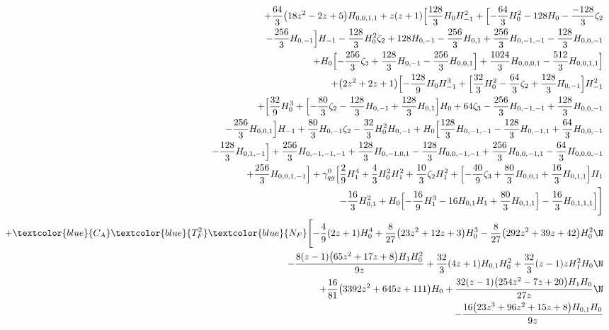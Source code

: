 \begin{eqnarray}
\nonumber \\ &&
+\frac{64}{3} \big(18 z^2-2 z+5\big) H_{0,0,1,1}+z (z+1)\Bigl[\frac{128}{3} H_0 H_{-1}^2+\Bigl[-\frac{64}{3} H_0^2-128 H_0-\frac{-128}{3} \zeta_2
\nonumber \\ &&
-\frac{256}{3} H_{0,-1}\Bigr] H_{-1}-\frac{128}{3}  H_0^2 \zeta_2+128 H_{0,-1}-\frac{256}{3}  H_{0,1}
+\frac{256}{3}H_{0,-1,-1}-\frac{128}{3}H_{0,0,-1}
\nonumber \\ &&
+H_0 \Bigl[-\frac{256}{3}  \zeta_3+\frac{128}{3}H_{0,-1}
-\frac{256}{3}  H_{0,0,1}\Bigr]+\frac{1024}{3}  H_{0,0,0,1}-\frac{512}{3} H_{0,0,1,1}\Bigr]
\nonumber \\ &&
+\big(2 z^2+2 z+1\big) \Bigl[-\frac{128}{9} H_0H_{-1}^3+\Bigl[\frac{32}{3} H_0^2-\frac{64}{3} \zeta_2+\frac{128}{3} H_{0,-1}
\Bigr]H_{-1}^2
\nonumber \\ &&
+\Bigl[\frac{32}{9} H_0^3+\Bigl[-\frac{80}{3}\zeta_2-\frac{128}{3} H_{0,-1}
+\frac{128}{3}  H_{0,1}\Bigr] H_0+64 \zeta_3
-\frac{256}{3} H_{0,-1,-1}
+\frac{128}{3} H_{0,0,-1}
\nonumber \\ &&
-\frac{256}{3} H_{0,0,1}\Bigr]H_{-1}
+\frac{80}{3} H_{0,-1} \zeta_2-\frac{32}{3}H_0^2 H_{0,-1}+H_0 \Bigl[\frac{128}{3} H_{0,-1,-1}-\frac{128}{3} H_{0,-1,1}+\frac{64}{3} H_{0,0,-1}
\nonumber \\ &&
-\frac{128}{3} H_{0,1,-1}\Bigr]+\frac{256}{3} H_{0,-1,-1,-1}+\frac{128}{3} H_{0,-1,0,1}
-\frac{128}{3}H_{0,0,-1,-1}
+\frac{256}{3} H_{0,0,-1,1}-\frac{64}{3}H_{0,0,0,-1}
\nonumber \\ &&
+\frac{256}{3} H_{0,0,1,-1}
\Bigr]+{\gamma}_{qg}^{0} \Bigl[\frac{2}{9} H_1^4+\frac{4}{3}H_0^2 H_1^2+\frac{10}{3} \zeta_2 H_1^2
+\Bigl[-\frac{40}{9} \zeta_3+\frac{80}{3} H_{0,0,1}+\frac{16}{3} H_{0,1,1}\Bigr] H_1
\nonumber \\ &&
-\frac{16}{3}H_{0,1}^2+H_0 \Bigl[-\frac{16}{9} H_1^3-16 H_{0,1} H_1+\frac{80}{3}H_{0,1,1}\Bigr]
-\frac{16}{3} H_{0,1,1,1}\Bigr]
\Biggr] 
%
\nonumber \\ &&
+\textcolor{blue}{C_A}  \textcolor{blue}{T_F^2}  \textcolor{blue}{N_F}\Biggl[
-\frac{4}{9} (2 z+1) H_0^4
+\frac{8}{27} \big(23 z^2+12 z+3\big) H_0^3
-\frac{8}{27} \big(292 z^2+39 z+42\big) H_0^2
\N\\&&
-\frac{8 (z-1) \big(65 z^2+17 z+8\big) H_1 H_0^2}{9 z}
+\frac{32}{3} (4 z+1) H_{0,1} H_0^2
+\frac{32}{3} (z-1) z H_1^2 H_0
\N\\&&
+\frac{16}{81} \big(3392 z^2+645 z+111\big) H_0
+\frac{32 (z-1) \big(254 z^2-7 z+20\big) H_1 H_0}{27 z}
\N\\&&
-\frac{16 \big(23 z^3+96 z^2+15 z+8\big) H_{0,1} H_0}{9 z}

\end{eqnarray}
